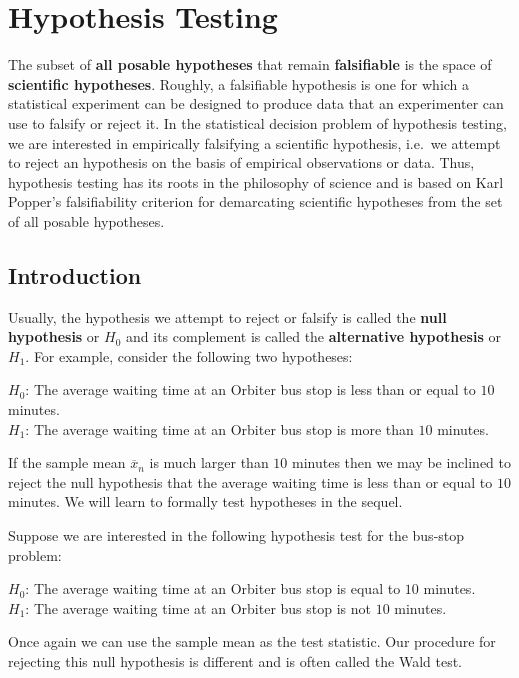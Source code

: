 \chapter{Hypothesis Testing}\label{S:HypTest}
The subset of {\bf all posable hypotheses} that remain {\bf falsifiable} is the space of {\bf scientific hypotheses}.  Roughly, a falsifiable hypothesis is one for which a statistical experiment can be designed to produce data that an experimenter can use to falsify or reject it.  In the statistical decision problem of hypothesis testing, we are interested in empirically falsifying a scientific hypothesis, i.e.~we attempt to reject an hypothesis on the basis of empirical observations or data.  Thus, hypothesis testing has its roots in the philosophy of science and is based on Karl Popper's falsifiability criterion for demarcating scientific hypotheses from the set of all posable hypotheses.

\section{Introduction}\label{S:HypTestIntro}
Usually, the hypothesis we attempt to reject or falsify is called the {\bf null hypothesis} or $H_0$ and its complement is called the {\bf alternative hypothesis} or $H_1$.  For example, consider the following two hypotheses:

$H_0$:  The average waiting time at an Orbiter bus stop is less than or equal to $10$ minutes.\\
$H_1$:  The average waiting time at an Orbiter bus stop is more than $10$ minutes.

If the sample mean $\overline{x}_n$ is much larger than $10$ minutes then we may be inclined to reject the null hypothesis that the average waiting time is less than or equal to $10$ minutes.  We will learn to formally test hypotheses in the sequel.

Suppose we are interested in the following hypothesis test for the bus-stop  problem:

$H_0$:  The average waiting time at an Orbiter bus stop is equal to $10$ minutes.\\
$H_1$:  The average waiting time at an Orbiter bus stop is not $10$ minutes.

Once again we can use the sample mean as the test statistic.  Our procedure for rejecting this null hypothesis is different and is often called the Wald test.


